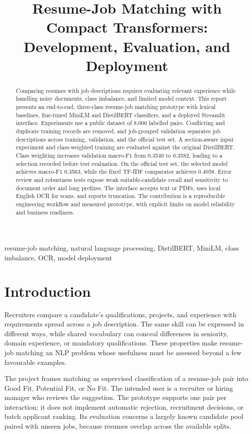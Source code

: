 \documentclass[conference,a4paper]{IEEEtran}
\title{Resume-Job Matching with Compact Transformers:\\Development, Evaluation, and Deployment}
\author{\IEEEauthorblockN{Pottabathini Vivekananda, Vikas Eranki, Manasa, and Bhavani Shanker}
\IEEEauthorblockA{Newton School of Technology, Rishihood University\\Sonipat, India}}
\newcommand{\GF}{Good Fit}
\newcommand{\PF}{Potential Fit}
\newcommand{\NF}{No Fit}
\begin{document}
\maketitle

\begin{abstract}
Comparing resumes with job descriptions requires evaluating relevant experience while handling noisy documents, class imbalance, and limited model context. This report presents an end-to-end, three-class resume-job matching prototype with lexical baselines, fine-tuned MiniLM and DistilBERT classifiers, and a deployed Streamlit interface. Experiments use a public dataset of 8,000 labelled pairs. Conflicting and duplicate training records are removed, and job-grouped validation separates job descriptions across training, validation, and the official test set. A section-aware input experiment and class-weighted training are evaluated against the original DistilBERT. Class weighting increases validation macro-F1 from 0.3540 to 0.3582, leading to a selection recorded before test evaluation. On the official test set, the selected model achieves macro-F1 0.3563, while the fixed TF-IDF comparator achieves 0.4058. Error review and robustness tests expose weak suitable-candidate recall and sensitivity to document order and long prefixes. The interface accepts text or PDFs, uses local English OCR for scans, and reports truncation. The contribution is a reproducible engineering workflow and measured prototype, with explicit limits on model reliability and business readiness.
\end{abstract}
\begin{IEEEkeywords}
resume-job matching, natural language processing, DistilBERT, MiniLM, class imbalance, OCR, model deployment
\end{IEEEkeywords}

\section{Introduction}
Recruiters compare a candidate's qualifications, projects, and experience with requirements spread across a job description. The same skill can be expressed in different ways, while shared vocabulary can conceal differences in seniority, domain experience, or mandatory qualifications. These properties make resume-job matching an NLP problem whose usefulness must be assessed beyond a few favourable examples.

The project frames matching as supervised classification of a resume-job pair into \GF, \PF, or \NF. The intended user is a recruiter or hiring manager who reviews the suggestion. The prototype supports one pair per interaction; it does not implement automatic rejection, recruitment decisions, or batch applicant ranking. Its evaluation concerns a largely known candidate pool paired with unseen jobs, because resumes overlap across the available splits.
\end{document}

